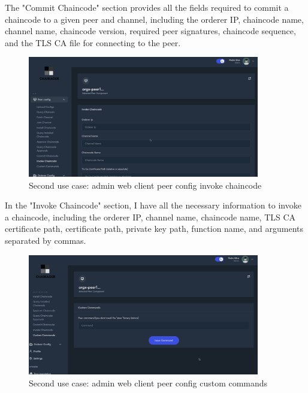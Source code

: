 The "Commit Chaincode" section provides all the fields required to commit a chaincode to a given peer and channel, including the orderer IP, chaincode name, channel name, chaincode version, required peer signatures, chaincode sequence, and the TLS CA file for connecting to the peer.

\begin{figure}[H]
    \centering
    \includegraphics[width=0.9\textwidth]{assets/use-case-2/peer-config-invoke-chaincode.png} %
    \caption{Second use case: admin web client peer config invoke chaincode}
    \label{fig:sample-image} 
\end{figure}

In the "Invoke Chaincode" section, I have all the necessary information to invoke a chaincode, including the orderer IP, channel name, chaincode name, TLS CA certificate path, certificate path, private key path, function name, and arguments separated by commas.

\begin{figure}[H]
    \centering
    \includegraphics[width=0.9\textwidth]{assets/use-case-2/peer-config-custom-commands.png} %
    \caption{Second use case: admin web client peer config custom commands}
    \label{fig:sample-image} 
\end{figure}

